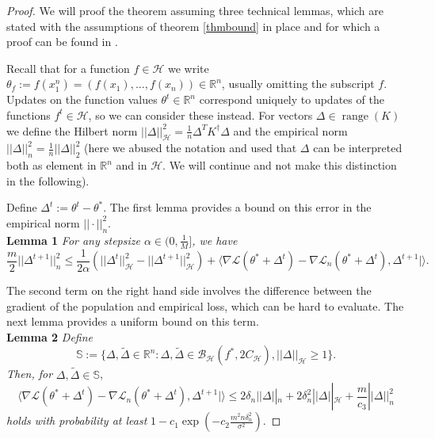 \begin{proof}
We will proof the theorem assuming three technical lemmas, which are stated with the assumptions of theorem \ref{thmbound} in place and for which a proof can be found in \cite{wei2017early}.

Recall that for a function $f\in \mathcal{H}$ we write $\theta_f := f(x_1^n) = (f(x_1),...,f(x_n))\in \mathbb{R}^n$, usually omitting the subscript $f$. Updates on the function values $\theta^t\in \mathbb{R}^n$ correspond uniquely to updates of the functions $f^t\in\mathcal{H}$, so we can consider these instead. For vectors $\Delta\in \operatorname{range}(K)$ we define the Hilbert norm $||\Delta||_{\mathcal{H}}^2 = \frac{1}{n}\Delta^TK^{\dagger}\Delta$ and the empirical norm $||\Delta||_n^2 = \frac{1}{n}||\Delta||_2^2$ (here we abused the notation and used that $\Delta$ can be interpreted both as element in $\mathbb{R}^n$ and in $\mathcal{H}$. We will continue and not make this distinction in the following).

Define $\Delta^t := \theta^t-\theta^*$. The first lemma provides a bound on this error in the empirical norm $||\cdot||_n^2$.\\
\textbf{Lemma 1}
\textit{For any stepsize $\alpha\in(0,\frac{1}{M}]$, we have}
\begin{equation}
\label{lemma1eq}
\frac{m}{2}||\Delta^{t+1}||_n^2\le \frac{1}{2\alpha}(||\Delta^t||_{\mathcal{H}}^2 - ||\Delta^{t+1}||_{\mathcal{H}}^2) + \langle\nabla\mathcal{L}(\theta^*+\Delta^t) - \nabla\mathcal{L}_n(\theta^*+\Delta^t), \Delta^{t+1}|\rangle.
\end{equation}

The second term on the right hand side involves the difference between the gradient of the population and empirical loss, which can be hard to evaluate. The next lemma provides a uniform bound on this term. \\
\textbf{Lemma 2}
\textit{Define}
\begin{equation*}
\mathbb{S} := \{\Delta, \tilde{\Delta}\in \mathbb{R}^n: \Delta,\tilde{\Delta}\in \mathcal{B}_{\mathcal{H}}(f^*,2C_{\mathcal{H}}), ||\Delta||_{\mathcal{H}} \geq 1 \}.
\end{equation*}
\textit{Then, for} $\Delta, \tilde{\Delta} \in \mathbb{S}$,
\begin{equation}
\label{lemma2eq}
\langle\nabla\mathcal{L}(\theta^*+\Delta^t) - \nabla\mathcal{L}_n(\theta^*+\Delta^t), \Delta^{t+1}|\rangle \le 2\delta_n||\Delta||_n + 2\delta_n^2||\Delta||_{\mathcal{H}} + \frac{m}{c_3}||\Delta||_n^2
\end{equation}
\textit{holds with probability at least} $1-c_1\exp(-c_2\frac{m^2n\delta_n^2}{\sigma^2})$.


\end{proof}
